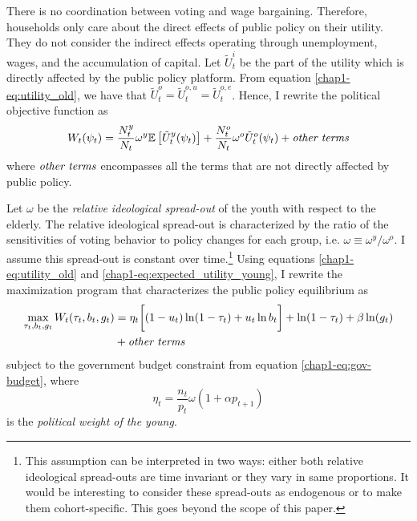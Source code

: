 There is no coordination between voting and wage bargaining. Therefore, households only care about the direct effects of public policy on their utility. They do not consider the indirect effects operating through unemployment, wages, and the accumulation of capital. Let $\tilde{U}^i_t$ be the part of the utility which is directly affected by the public policy platform. From equation \eqref{chap1-eq:utility_old}, we have that $\tilde{U}_t^o = \tilde{U}_t^{o,u} = \tilde{U}_t^{o,e}$. 
Hence, I rewrite the political objective function as
\begin{equation*}
	W_t(\psi_t) = \frac{N_t^y}{N_t} \omega^y \mathbb{E}\left[\tilde{U}_t^y(\psi_t)\right] + \frac{N_t^o}{N_t} \omega^o \tilde{U}_t^o(\psi_t) + \text{\textit{other~terms}}
\end{equation*}
where $\text{\textit{other~terms}}$ encompasses all the terms that are not directly affected by public policy.

Let $\omega$ be the \textit{relative ideological spread-out} of the youth with respect to the elderly. The relative ideological spread-out is characterized by the ratio of the sensitivities of voting behavior to policy changes for each group, i.e. $\omega \equiv \omega^y/\omega^o$. I assume this spread-out is constant over time.\footnote{This assumption can be interpreted in two ways: either both relative ideological spread-outs are time invariant or they vary in same proportions. It would be interesting to consider these spread-outs as endogenous or to make them cohort-specific. This goes beyond the scope of this paper.} Using equations \eqref{chap1-eq:utility_old} and \eqref{chap1-eq:expected_utility_young}, I rewrite the maximization program that characterizes the public policy equilibrium as 
\begin{align*}
	\max_{\tau_t, b_t, g_t} W_t(\tau_t, b_t, g_t) &= \eta_t \bigg[ (1-u_t)\ln(1-\tau_t) + u_t \ln b_t\bigg] + \ln(1-\tau_t) + \beta \ln(g_t) \\
	&+ \text{\textit{other~terms}}
\end{align*}
subject to the government budget constraint from equation \eqref{chap1-eq:gov-budget}, where 
\begin{equation*}
	\eta_t = \frac{n_t}{p_t}\omega(1+\alpha p_{t+1})
\end{equation*}
is the \textit{political weight of the young}.